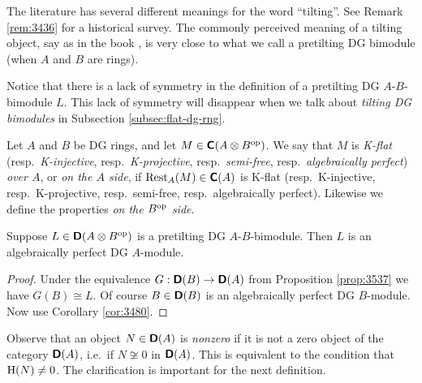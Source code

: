 \begin{rem} \label{rem:3490}
The literature has several different meanings for the word ``tilting''. 
See Remark \ref{rem:3436} for a historical survey. 
The commonly perceived meaning of a
tilting object, say as in the book \cite{AnHaKr}, is very close to what we call 
a pretilting DG bimodule (when $A$ and $B$ are rings). 

Notice that there is a lack of symmetry in the 
definition of a pretilting DG $A$-$B$-bimodule $L$.
This lack of symmetry will disappear when we talk about {\em tilting DG 
bimodules} in Subsection \ref{subsec:flat-dg-rng}. 
\end{rem}

\begin{dfn} \label{dfn:3446}
Let $A$ and $B$ be DG rings, and let 
$M \in \boldsymbol{\mathsf{C}}(A \otimes B^{\mathrm{op}})$. We say that $M$ is {\em K-flat} 
(resp.\ {\em K-injective}, resp.\ {\em K-projective}, resp.\ {\em semi-free},
resp.\ {\em algebraically perfect}) {\em over $A$}, or {\em on the $A$ side},
if $\operatorname{Rest}_A(M) \in \boldsymbol{\mathsf{C}}(A)$ is K-flat (resp.\  K-injective, resp.\ 
K-projective, resp.\ semi-free, resp.\ algebraically perfect).
Likewise we define the properties {\em on the $B^{\mathrm{op}}$ side}. 
\end{dfn}

\begin{prop} \label{prop:3431}
Suppose $L \in \boldsymbol{\mathsf{D}}(A \otimes B^{\mathrm{op}})$ is a pretilting DG 
$A$-$B$-bimodule. Then $L$ is an algebraically perfect DG $A$-module.
\end{prop}

\begin{proof}
Under the equivalence $G : \boldsymbol{\mathsf{D}}(B) \to \boldsymbol{\mathsf{D}}(A)$ from Proposition 
\ref{prop:3537} we have $G(B) \cong L$. Of course $B \in \boldsymbol{\mathsf{D}}(B)$ is an 
algebraically perfect DG $B$-module. Now use Corollary \ref{cor:3480}. 
\end{proof}

Observe that an object $N \in \boldsymbol{\mathsf{D}}(A)$ is {\em nonzero} if it is 
not a zero object of the category $\boldsymbol{\mathsf{D}}(A)$, i.e.\ if $N \not\cong 0$ in
$\boldsymbol{\mathsf{D}}(A)$. This is equivalent to the condition that 
$\operatorname{H}(N) \neq 0$. The clarification is important for the next definition. 

